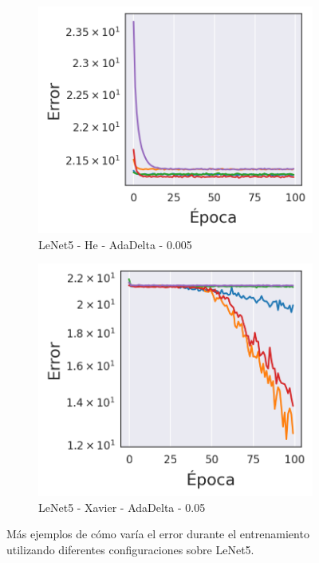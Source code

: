 \begin{figure}[H]
    \bigskip

    \begin{subfigure}{.47\textwidth}
        \centering
        \includegraphics[width=1\linewidth]{imagenes/image_classification/original_dataset/loss4.png}
        \caption{LeNet5 - He - AdaDelta - 0.005}
    \end{subfigure}%
    \begin{subfigure}{.47\textwidth}
        \centering
        \includegraphics[width=1\linewidth]{imagenes/image_classification/original_dataset/loss5.png}
        \caption{LeNet5 - Xavier - AdaDelta - 0.05}
    \end{subfigure}

    \caption{Más ejemplos de cómo varía el error durante el entrenamiento utilizando diferentes configuraciones sobre LeNet5.}
    \label{te-lenet}
\end{figure}

